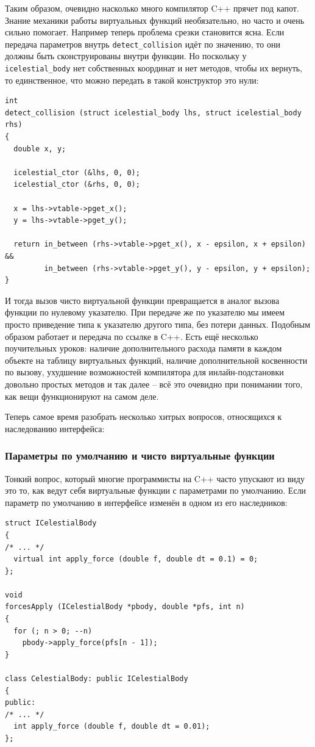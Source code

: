 \documentclass[a4paper,12pt,oneside]{article}
\begin{document}
Таким образом, очевидно насколько много компилятор C++ прячет под капот. Знание механики работы виртуальных функций необязательно, но часто и очень сильно помогает. Например теперь проблема срезки становится ясна. Если передача параметров внутрь \lstinline!detect_collision! идёт по значению, то они должны быть сконструированы внутри функции. Но поскольку у \lstinline!icelestial_body! нет собственных координат и нет методов, чтобы их вернуть, то единственное, что можно передать в такой конструктор это нули:

\begin{lstlisting}
int
detect_collision (struct icelestial_body lhs, struct icelestial_body rhs)
{
  double x, y;
  
  icelestial_ctor (&lhs, 0, 0);
  icelestial_ctor (&rhs, 0, 0);

  x = lhs->vtable->pget_x();
  y = lhs->vtable->pget_y();
 
  return in_between (rhs->vtable->pget_x(), x - epsilon, x + epsilon) && 
         in_between (rhs->vtable->pget_y(), y - epsilon, y + epsilon);
}
\end{lstlisting}

И тогда вызов чисто виртуальной функции превращается в аналог вызова функции по нулевому указателю. При передаче же по указателю мы имеем просто приведение типа к указателю другого типа, без потери данных. Подобным образом работает и передача по ссылке в C++. Есть ещё несколько поучительных уроков: наличие дополнительного расхода памяти в каждом объекте на таблицу виртуальных функций, наличие дополнительной косвенности по вызову, ухудшение возможностей компилятора для инлайн-подстановки довольно простых методов и так далее -- всё это очевидно при понимании того, как вещи функционируют на самом деле.

Теперь самое время разобрать несколько хитрых вопросов, относящихся к наследованию интерфейса:

\subsubsection{Параметры по умолчанию и чисто виртуальные функции}

Тонкий вопрос, который многие программисты на C++ часто упускают из виду это то, как ведут себя виртуальные функции с параметрами по умолчанию. Если параметр по умолчанию в интерфейсе изменён в одном из его наследников:

\begin{lstlisting}
struct ICelestialBody
{
/* ... */
  virtual int apply_force (double f, double dt = 0.1) = 0;
};

void 
forcesApply (ICelestialBody *pbody, double *pfs, int n)
{
  for (; n > 0; --n)
    pbody->apply_force(pfs[n - 1]);
}

class CelestialBody: public ICelestialBody
{
public:
/* ... */
  int apply_force (double f, double dt = 0.01);
};
\end{lstlisting}
\end{document}
